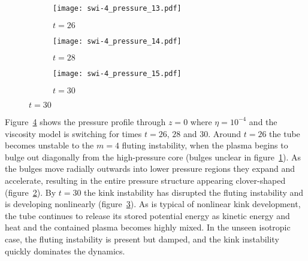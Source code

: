 \begin{figure}[t]
  \centering
    \begin{subfigure}{0.32\textwidth}
      \texttt{[image: swi-4\_pressure\_13.pdf]}
      \caption{$t=26$}
      \label{fig:swi-4_pressure_13}
    \end{subfigure}
    \hfill
    \begin{subfigure}{0.32\textwidth}
      \texttt{[image: swi-4\_pressure\_14.pdf]}
      \caption{$t=28$}
      \label{fig:swi-4_pressure_14}
    \end{subfigure}
    \hfill
    \begin{subfigure}{0.32\textwidth}
      \texttt{[image: swi-4\_pressure\_15.pdf]}
      \caption{$t=30$}
      \label{fig:swi-4_pressure_15}
    \end{subfigure}
\label{fig:kink_pressure_slices-4}%
\end{figure}

Figure~\ref{fig:kink_pressure_slices-4} shows the pressure profile through $z=0$ where $\eta=10^{-4}$ and the viscosity model is switching for times $t=26$, $28$ and $30$. Around $t=26$ the tube becomes unstable to the $m=4$ fluting instability, when the plasma begins to bulge out diagonally from the high-pressure core (bulges unclear in figure~\ref{fig:swi-4_pressure_13}). As the bulges move radially outwards into lower pressure regions they expand and accelerate, resulting in the entire pressure structure appearing clover-shaped (figure~\ref{fig:swi-4_pressure_14}). By $t=30$ the kink instability has disrupted the fluting instability and is developing nonlinearly (figure~\ref{fig:swi-4_pressure_15}). As is typical of nonlinear kink development, the tube continues to release its stored potential energy as kinetic energy and heat and the contained plasma becomes highly mixed. In the unseen isotropic case, the fluting instability is present but damped, and the kink instability quickly dominates the dynamics.

